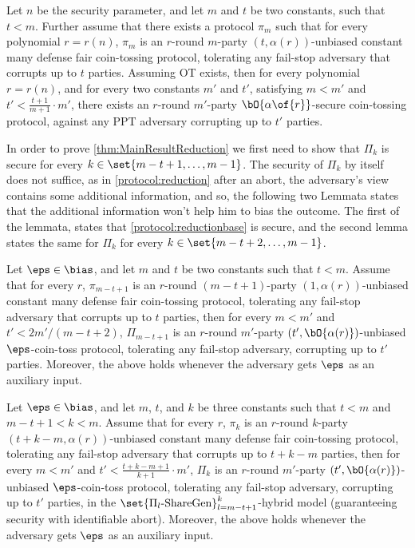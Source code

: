 \begin{corollary}\label{corollary:MainResultReduction}
Let $n$ be the security parameter, and let $m$ and $t$ be two constants, such that $t<m$. Further assume that there exists a protocol $\pi_m$ such that for every polynomial $r=r(n)$, $\pi_m$ is an $r$-round $m$-party $(t,\alpha(r))$-unbiased constant many defense fair coin-tossing protocol, tolerating any fail-stop adversary that corrupts up to $t$ parties. Assuming OT exists, then for every polynomial $r=r(n)$, and for every two constants $m'$ and $t'$, satisfying $m<m'$ and $t'<\frac{t+1}{m+1}\cdot m'$, there exists an $r$-round $m'$-party $\bO{\alpha\of{r}}$-secure coin-tossing protocol, against any PPT adversary corrupting up to $t'$ parties.
\end{corollary}

In order to prove \cref{thm:MainResultReduction} we first need to show that $\Pi_k$ is secure for every $k\in\set{m-t+1,\ldots,m-1}$. The security of $\Pi_k$ by itself does not suffice, as in \cref{protocol:reduction} after an abort, the adversary's view contains some additional information, and so, the following two Lemmata states that the additional information won't help him to bias the outcome. The first of the lemmata, states that \cref{protocol:reductionbase} is secure, and the second lemma states the same for $\Pi_k$ for every $k\in\set{m-t+2,\ldots,m-1}$.


\begin{lemma}
	Let $\eps\in\bias$, and let $m$ and $t$ be two constants such that $t<m$. Assume that for every $r$, $\pi_{m-t+1}$ is an $r$-round $(m-t+1)$-party $(1,\alpha(r))$-unbiased constant many defense fair coin-tossing protocol, tolerating any fail-stop adversary that corrupts up to $t$ parties, then for every $m<m'$ and $t'<2m'/(m-t+2)$, $\Pi_{m-t+1}$ is an $r$-round $m'$-party $(t',\bO{\alpha(r)})$-unbiased $\eps$-coin-toss protocol, tolerating any fail-stop adversary, corrupting up to $t'$ parties. Moreover, the above holds whenever the adversary gets $\eps$ as an auxiliary input.
\end{lemma}

\begin{lemma}
	Let $\eps\in\bias$, and let $m$, $t$, and $k$ be three constants such that $t<m$ and $m-t+1<k<m$. Assume that for every $r$, $\pi_{k}$ is an $r$-round $k$-party $(t+k-m,\alpha(r))$-unbiased constant many defense fair coin-tossing protocol, tolerating any fail-stop adversary that corrupts up to $t+k-m$ parties, then for every $m<m'$ and $t'<\frac{t+k-m+1}{k+1}\cdot m'$, $\Pi_{k}$ is an $r$-round $m'$-party $(t',\bO{\alpha(r)})$-unbiased $\eps$-coin-toss protocol, tolerating any fail-stop adversary, corrupting up to $t'$ parties, in the $\set{\Pi_l\text{-ShareGen}}_{l=m-t+1}^{k}$-hybrid model (guaranteeing security with identifiable abort). Moreover, the above holds whenever the adversary gets $\eps$ as an auxiliary input.
\end{lemma}